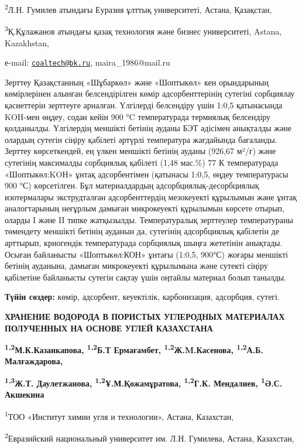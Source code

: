 \textsuperscript{2}Л.Н. Гумилев атындағы Еуразия ұлттық университеті,
Астана, Қазақстан,

\textsuperscript{3}Қ.Құлажанов атындағы қазақ технология және бизнес
университеті, Astana, Kazakhstan,

е-mail: \href{mailto:coaltech@bk.ru}{\nolinkurl{coaltech@bk.ru}},
maira\_1986@mail.ru

Зерттеу Қазақстанның «Шұбаркөл» және «Шоптыкөл» кен орындарының
көмірлерінен алынған белсендірілген көмір адсорбенттерінің сутегіні
сорбциялау қасиеттерін зерттеуге арналған. Үлгілерді белсендіру үшін
1:0,5 қатынасында KOH-мен өңдеу, содан кейін 900 °C температурада
термиялық белсендіру қолданылды. Үлгілердің меншікті бетінің ауданы БЭТ
әдісімен анықталды және олардың сутегін сіңіру қабілеті әртүрлі
температура жағдайында бағаланды. Зерттеу көрсеткендей, ең үлкен
меншікті бетінің ауданы (926,67 м²/г) және сутегінің максималды
сорбциялық қабілеті (1,48 мас.\%) 77 К температурада «Шоптыкөл:KOН»
ұнтақ адсорбентімен (қатынасы 1:0,5, өңдеу температурасы 900 °С)
көрсетілген. Бұл материалдардың адсорбциялық-десорбциялық изотермалары
экструдталған адсорбенттердің мезокеуекті құрылымын және ұнтақ
аналогтарының неғұрлым дамыған микрокеуекті құрылымын көрсете отырып,
оларды I және II типке жатқызылды. Температуралық зерттеулер
температураны төмендету меншікті бетінің ауданын да, сутегінің
адсорбциялық қабілетін де арттырып, криогендік температурада сорбциялық
шыңға жететінін анықтады. Осыған байланысты «Шоптыкөл:КОН» ұнтағы
(1:0,5, 900°С) жоғары меншікті бетінің ауданына, дамыған микрокеуекті
құрылымына және сутекті сіңіру қабілетіне байланысты сутегін сақтау үшін
оңтайлы материал болып танылды.

{\bfseries Түйін сөздер:} көмір, адсорбент, кеуектілік, карбонизация,
адсорбция, сутегі.

{\bfseries ХРАНЕНИЕ ВОДОРОДА В ПОРИСТЫХ УГЛЕРОДНЫХ МАТЕРИАЛАХ ПОЛУЧЕННЫХ НА
ОСНОВЕ УГЛЕЙ КАЗАХСТАНА}

{\bfseries \textsuperscript{1,2}М.К.Казанкапова\textsuperscript{\envelope },
\textsuperscript{1,2}Б.Т Ермағамбет, \textsuperscript{1,2}Ж.M.Касенова,
\textsuperscript{1,2}А.Б. Малғаждарова,}

{\bfseries \textsuperscript{1,3}Ж.Т. Даулетжанова,
\textsuperscript{1,2}Ұ.М.Қожамұратова, \textsuperscript{1,2}Г.К.
Мендалиев, \textsuperscript{1}Ә.С. Акшекина}

\textsuperscript{1}ТОО «Институт химии угля и технологии», Астана,
Казахстан,

\textsuperscript{2}Евразийский национальный университет им. Л.Н.
Гумилева, Астана, Казахстан,

